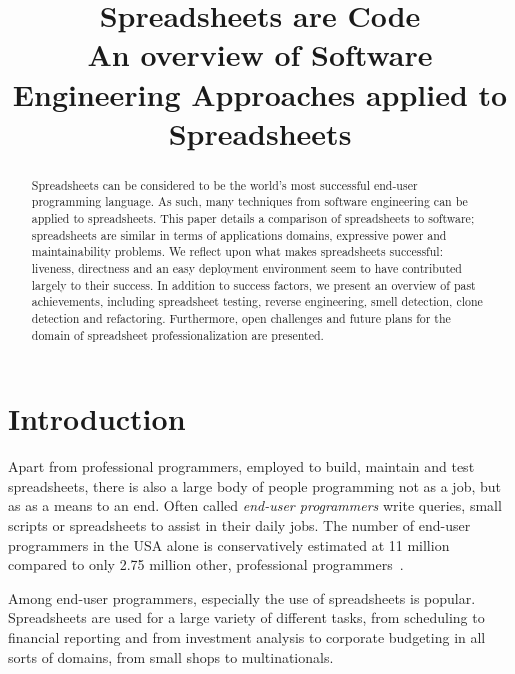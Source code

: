 \documentclass[conference]{IEEEtran}
\begin{document}
\title{Spreadsheets are Code \large{\\An overview of Software Engineering Approaches applied to Spreadsheets}}


\author{
}


\maketitle

\begin{abstract}
Spreadsheets can be considered to be the world's most successful end-user programming language. As such, many techniques from software engineering can be applied to spreadsheets. This paper details a comparison of spreadsheets to software; spreadsheets are similar in terms of applications domains, expressive power and maintainability problems. We reflect upon what makes spreadsheets successful: liveness, directness and an easy deployment environment seem to have contributed largely to their success. In addition to success factors, we present an overview of past achievements, including spreadsheet testing, reverse engineering, smell detection, clone detection and refactoring. Furthermore, open challenges and future plans for the domain of spreadsheet professionalization are presented.
\end{abstract}

\IEEEpeerreviewmaketitle

\section{Introduction}
Apart from professional programmers, employed to build, maintain and test spreadsheets, there is also a large body of people programming not as a job, but as as a means to an end. Often called \emph {end-user programmers} write queries, small scripts or spreadsheets to assist in their daily jobs. The number of end-user programmers in the USA alone is conservatively estimated at 11 million compared to only 2.75 million other, professional programmers~\cite{Scaf2005}. 

Among end-user programmers, especially the use of spreadsheets is popular. Spreadsheets are used for a large variety of different tasks, from scheduling to financial reporting and from investment analysis to corporate budgeting in all sorts of domains, from small shops to multinationals. 
\end{document}
